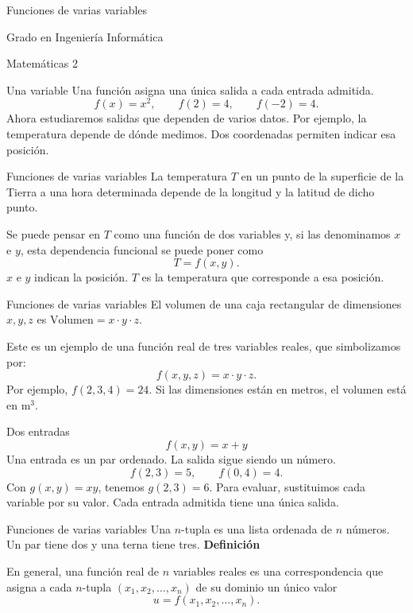 

\begin{frame}{}
\centering\LARGE Funciones de varias variables\par\vspace{1cm}\large Grado en Ingeniería Informática\par Matemáticas 2
\end{frame}
\begin{frame}{Una variable}
Una función asigna una única salida a cada entrada admitida.
\[f(x)=x^2,\qquad f(2)=4,\qquad f(-2)=4.\]
Ahora estudiaremos salidas que dependen de varios datos.
\medskip
Por ejemplo, la temperatura depende de dónde medimos. Dos coordenadas permiten indicar esa posición.
\end{frame}
\begin{frame}{Funciones de varias variables}
La temperatura $T$ en un punto de la superficie de la Tierra a una hora determinada depende de la longitud y la latitud de dicho punto.
\medskip

Se puede pensar en $T$ como una función de dos variables y, si las denominamos $x$ e $y$, esta dependencia funcional se puede poner como
\[T=f(x,y).\]
$x$ e $y$ indican la posición. $T$ es la temperatura que corresponde a esa posición.
\end{frame}
\begin{frame}{Funciones de varias variables}
El volumen de una caja rectangular de dimensiones $x,y,z$ es $\text{Volumen}=x\cdot y\cdot z$.
\medskip

Este es un ejemplo de una función real de tres variables reales, que simbolizamos por:
\[f(x,y,z)=x\cdot y\cdot z.\]
Por ejemplo, $f(2,3,4)=24$. Si las dimensiones están en metros, el volumen está en $\mathrm m^3$.
\end{frame}
\begin{frame}{Dos entradas}
\[f(x,y)=x+y\]
Una entrada es un par ordenado. La salida sigue siendo un número.
\[f(2,3)=5,\qquad f(0,4)=4.\]
Con $g(x,y)=xy$, tenemos $g(2,3)=6$.
\medskip
Para evaluar, sustituimos cada variable por su valor. Cada entrada admitida tiene una única salida.
\end{frame}
\begin{frame}{Funciones de varias variables}
Una $n$-tupla es una lista ordenada de $n$ números. Un par tiene dos y una terna tiene tres.
\medskip
\textbf{Definición}
\medskip

En general, una función real de $n$ variables reales es una correspondencia que asigna a cada $n$-tupla $(x_1,x_2,\ldots,x_n)$ de su dominio un único valor
\[u=f(x_1,x_2,\ldots,x_n).\]
\end{frame}

